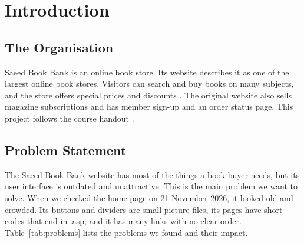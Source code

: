 \documentclass[12pt,a4paper]{article}
\begin{document}
\section{Introduction}

\subsection{The Organisation}
Saeed Book Bank is an online book store. Its website describes it as one of the largest online book stores. Visitors can search and buy books on many subjects, and the store offers special prices and discounts \cite{sbb}. The original website also sells magazine subscriptions and has member sign-up and an order status page. This project follows the course handout \cite{handout}.

\subsection{Problem Statement}
The Saeed Book Bank website has most of the things a book buyer needs, but its user interface is outdated and unattractive. This is the main problem we want to solve. When we checked the home page on 21 November 2026, it looked old and crowded. Its buttons and dividers are small picture files, its pages have short codes that end in .asp, and it has many links with no clear order. Table~\ref{tab:problems} lists the problems we found and their impact.
\end{document}
